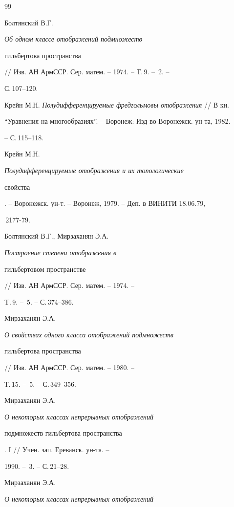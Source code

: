  


 


\begin{thebibliography}{99} 


 




Болтянский В.Г. {\em Об одном классе отображений подмножеств


гильбертова пространства} 


// Изв. АН АрмССР. Сер. матем. -- 1974. -- Т.\,9. -- \No\,2. -- 


С.\,107--120. 




Крейн М.Н. {\em Полудифференцируемые фредгольмовы отображения} // В кн. 


``Уравнения на многообразиях''. -- Воронеж: Изд-во Воронежск. ун-та, 1982. 


-- С.\,115--118. 




Крейн М.Н. {\em Полудифференцируемые отображения и их топологические 


свойства}. -- Воронежск. ун-т. -- Воронеж, 1979. -- Деп. в ВИНИТИ 18.06.79, 


\No\,2177-79. 




Болтянский В.Г., Мирзаханян Э.А. {\em Построение степени отображения в 


гильбертовом пространстве} // Изв. АН АрмССР. Сер. матем. -- 1974. -- 


T.\,9. -- \No\,5. -- С.\,374--386. 




Мирзаханян Э.А. {\em О свойствах одного класса отображений подмножеств 


гильбертова пространства} // Изв. АН АрмССР. Сер. матем. -- 1980. -- 


Т.\,15. -- \No\,5. -- С.\,349--356. 




Мирзаханян Э.А. {\em О некоторых классах непрерывных отображений 


подмножеств гильбертова пространства}. I // Учен. зап. Ереванск. ун-та. -- 


1990. -- \No\,3. -- С.\,21--28. 




Мирзаханян Э.А. {\em О некоторых классах непрерывных отображений 


}
\end{thebibliography}
